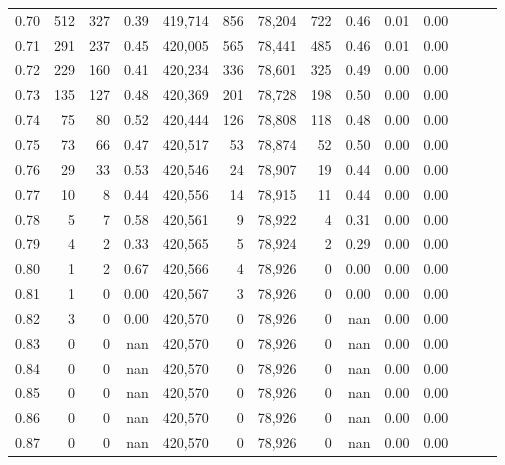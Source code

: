 \begin{tabular}{rrrrrrrrrrrrrr}
0.70 &     512 &    327 &  0.39 &  419,714 &      856 &  78,204 &     722 &  0.46 &  0.01 &      0.00 \\
0.71 &     291 &    237 &  0.45 &  420,005 &      565 &  78,441 &     485 &  0.46 &  0.01 &      0.00 \\
0.72 &     229 &    160 &  0.41 &  420,234 &      336 &  78,601 &     325 &  0.49 &  0.00 &      0.00 \\
0.73 &     135 &    127 &  0.48 &  420,369 &      201 &  78,728 &     198 &  0.50 &  0.00 &      0.00 \\
0.74 &      75 &     80 &  0.52 &  420,444 &      126 &  78,808 &     118 &  0.48 &  0.00 &      0.00 \\
0.75 &      73 &     66 &  0.47 &  420,517 &       53 &  78,874 &      52 &  0.50 &  0.00 &      0.00 \\
0.76 &      29 &     33 &  0.53 &  420,546 &       24 &  78,907 &      19 &  0.44 &  0.00 &      0.00 \\
0.77 &      10 &      8 &  0.44 &  420,556 &       14 &  78,915 &      11 &  0.44 &  0.00 &      0.00 \\
0.78 &       5 &      7 &  0.58 &  420,561 &        9 &  78,922 &       4 &  0.31 &  0.00 &      0.00 \\
0.79 &       4 &      2 &  0.33 &  420,565 &        5 &  78,924 &       2 &  0.29 &  0.00 &      0.00 \\
0.80 &       1 &      2 &  0.67 &  420,566 &        4 &  78,926 &       0 &  0.00 &  0.00 &      0.00 \\
0.81 &       1 &      0 &  0.00 &  420,567 &        3 &  78,926 &       0 &  0.00 &  0.00 &      0.00 \\
0.82 &       3 &      0 &  0.00 &  420,570 &        0 &  78,926 &       0 &   nan &  0.00 &      0.00 \\
0.83 &       0 &      0 &   nan &  420,570 &        0 &  78,926 &       0 &   nan &  0.00 &      0.00 \\
0.84 &       0 &      0 &   nan &  420,570 &        0 &  78,926 &       0 &   nan &  0.00 &      0.00 \\
0.85 &       0 &      0 &   nan &  420,570 &        0 &  78,926 &       0 &   nan &  0.00 &      0.00 \\
0.86 &       0 &      0 &   nan &  420,570 &        0 &  78,926 &       0 &   nan &  0.00 &      0.00 \\
0.87 &       0 &      0 &   nan &  420,570 &        0 &  78,926 &       0 &   nan &  0.00 &      0.00 \\

\end{tabular}
